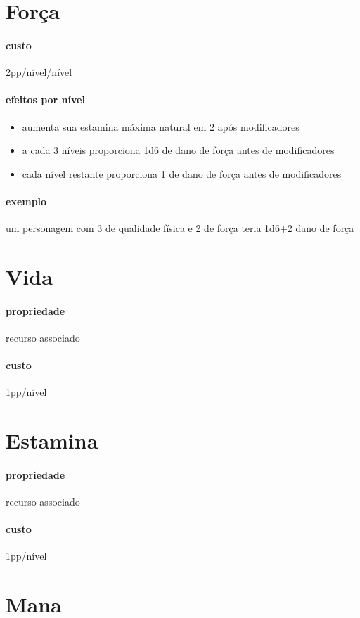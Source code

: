 \section{Força}
\paragraph{custo} 2pp/nível/nível
\paragraph{efeitos por nível} 
\begin{itemize}
  \item aumenta sua estamina máxima natural em 2 após modificadores
  \item a cada 3 níveis proporciona 1d6 de dano de força antes de modificadores
  \item cada nível restante proporciona 1 de dano de força antes de modificadores
\end{itemize}
\paragraph{exemplo} um personagem com 3 de qualidade física e 2 de força teria 1d6+2 dano de força 
%
%
\section{Vida}
\paragraph{propriedade} recurso associado
\paragraph{custo} 1pp/nível
%
%
\section{Estamina}
\paragraph{propriedade} recurso associado
\paragraph{custo} 1pp/nível
%
%
\section{Mana}
